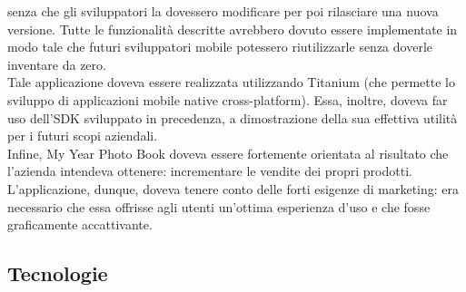 				senza che gli sviluppatori la dovessero modificare per poi rilasciare una nuova versione. Tutte le funzionalità
				descritte avrebbero dovuto essere implementate in modo tale che futuri sviluppatori mobile potessero riutilizzarle  
				senza doverle inventare da zero.\\
				Tale applicazione doveva essere realizzata utilizzando Titanium (che permette lo sviluppo di applicazioni mobile
				native cross-platform). Essa, inoltre, doveva far uso dell'SDK sviluppato in precedenza, a dimostrazione della sua
				effettiva utilità per i futuri scopi aziendali.\\
				Infine, My Year Photo Book doveva essere fortemente orientata al risultato che l'azienda intendeva ottenere:
				incrementare le vendite dei propri prodotti. L'applicazione, dunque, doveva tenere conto delle forti esigenze di
				marketing: era necessario che essa offrisse agli utenti un'ottima esperienza d'uso e che fosse graficamente
				accattivante.
		\subsection{Tecnologie}
